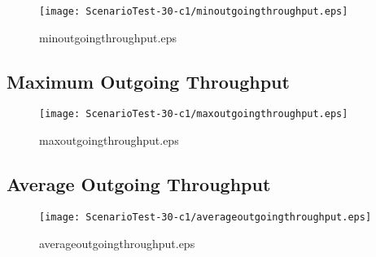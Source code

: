 \documentclass{elsart}
\begin{document}
\begin{figure}[ht]
\centering
\texttt{[image: ScenarioTest-30-c1/minoutgoingthroughput.eps]}
\caption{minoutgoingthroughput.eps}\label{fig:minoutgoingthroughput}
\end{figure}

\clearpage
\subsection{Maximum Outgoing Throughput}

\begin{figure}[ht]
\centering
\texttt{[image: ScenarioTest-30-c1/maxoutgoingthroughput.eps]}
\caption{maxoutgoingthroughput.eps}\label{fig:maxoutgoingthroughput}
\end{figure}

\clearpage
\subsection{Average Outgoing Throughput}

\begin{figure}[ht]
\centering
\texttt{[image: ScenarioTest-30-c1/averageoutgoingthroughput.eps]}
\caption{averageoutgoingthroughput.eps}\label{fig:averageoutgoingthroughput}
\end{figure}

\clearpage
\end{document}

